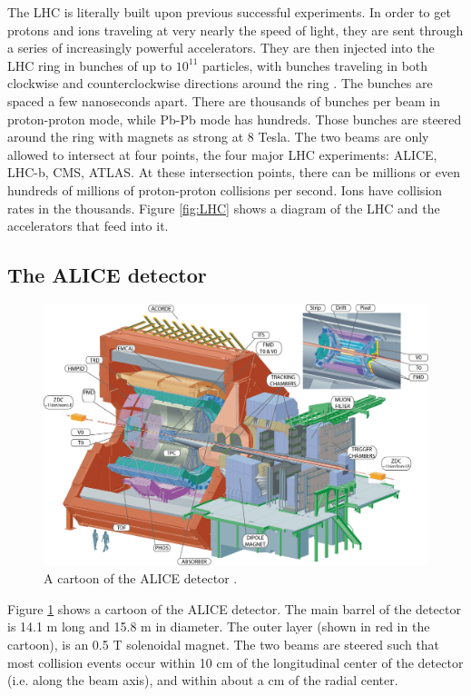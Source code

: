The LHC is literally built upon previous successful experiments. 
In order to get protons and ions traveling at very nearly the speed of light, they are sent through a series of increasingly powerful accelerators.
They are then injected into the LHC ring in bunches of up to $10^{11}$ particles, with bunches traveling in both clockwise and counterclockwise directions around the ring \cite{Lefevre:1092437}.
The bunches are spaced a few nanoseconds apart.
There are thousands of bunches per beam in proton-proton mode, while Pb-Pb mode has hundreds.
Those bunches are steered around the ring with magnets as strong at 8 Tesla.
The two beams are only allowed to intersect at four points, the four major LHC experiments: ALICE, LHC-b, CMS, ATLAS.
At these intersection points, there can be millions or even hundreds of millions of proton-proton collisions per second.
Ions have collision rates in the thousands.
Figure \ref{fig:LHC} shows a diagram of the LHC and the accelerators that feed into it.
 
 
\subsection{The ALICE detector}
\label{sec:ALICEDetector}

 
\begin{figure}[hbt]
\includegraphics[width=36pc]{Figures/BorrowedFigures/ALICEDetector.jpg}
\caption[Cartoon of the ALICE detector]{A cartoon of the ALICE detector \cite{Aamodt:2008zz}.}
\label{fig:ALICEDetector}
\end{figure}
Figure \ref{fig:ALICEDetector} shows a cartoon of the ALICE detector.
The main barrel of the detector is 14.1 m long and 15.8 m in diameter. The outer layer (shown in red in the cartoon), is an 0.5 T solenoidal magnet.
The two beams are steered such that most collision events occur within 10 cm of the longitudinal center of the detector (i.e. along the beam axis), and within about a cm of the radial center.

